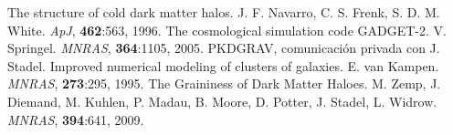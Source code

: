 \documentclass[12pt,spanish]{article}
\begin{document}
\begin{thebibliography}{00}
 The structure of cold dark matter halos. J. F. Navarro,
  C. S. Frenk, S. D. M. White. {\it ApJ}, {\bf 462}:563, 1996.
 The cosmological simulation code
  GADGET-2. V. Springel. {\it MNRAS}, {\bf 364}:1105, 2005.
 PKDGRAV, comunicación privada con J. Stadel.
 Improved numerical modeling of clusters of galaxies.
  E. van Kampen. {\it MNRAS}, {\bf 273}:295, 1995.
 The Graininess of Dark Matter Haloes. M. Zemp,
J. Diemand, M. Kuhlen, P. Madau, B. Moore, D. Potter,
J. Stadel, L. Widrow.  {\it MNRAS}, {\bf 394}:641, 2009. 
\end{thebibliography}
\end{document}
